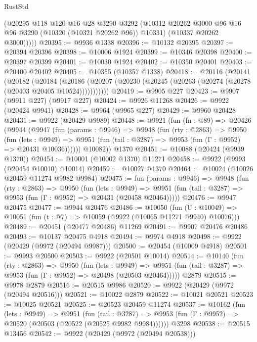 \begin{lexlean}{RustStd}
\begin{coremodule}
          (@20295
            @118
            @120
            @16
            @28
            @3290
            @3292
            (@10312 @20262 @3000 @96 @16 @96 @3290 (@10320 (@10321 @20262 @96)) @10331)
            (@10337 @20262 @3000)))))
@20395 := @9936 @1338
@20396 := @10132 @20395
@20397 := @20394 @20396
@20398 := @10006 @1924
@20399 := @10346 @20398
@20400 := @20397 @20399
@20401 := @10030 @1924
@20402 := @10350 @20401
@20403 := @20400 @20402
@20405 := @10355 (@10357 @1338)
@20418 := @20116
    (@20141
      (@20182
        (@20184
          (@20186 (@20207 (@20230 (@20245 (@20263 (@20274 (@20278 (@20403 @20405 @10524)))))))))))
@20419 := @9905 @227
@20423 := @9907 (@9911 @227) (@9917 @227)
@20424 := @9926 @11268
@20426 := @9922 (@20424 @9941)
@20428 := @9964 (@9965 @227)
@20429 := @9960 @20428
@20431 := @9922 (@20429 @9989)
@20448 := @9921
    (fun (fn : @89) =>
    @20426
      (@9944
        (@9947
          (fun (params : @9946) =>
          @9948
            (fun (rty : @2863) =>
            @9950
              (fun (lets : @9949) =>
              @9951 (fun (tail : @3287) => @9953 (fun (Γ : @9952) => @20431 @10036))))))
        @10082))
    @1370
@20451 := @10088 (@20424 (@9939 @1370))
@20454 := @10001 (@10002 @1370) @11271
@20458 := @9922 (@9993 (@20454 @10010) @10014)
@20459 := @10027 @1370
@20464 := @10024 (@10026 @20459 @11274 @9982 @9984)
@20475 := fun (params : @9946) =>
  @9948
    (fun (rty : @2863) =>
    @9950
      (fun (lets : @9949) =>
      @9951 (fun (tail : @3287) => @9953 (fun (Γ : @9952) => @20431 (@20458 @20464)))))
@20476 := @9947 @20475
@20477 := @9944 @20476
@20486 := @10050
    (fun (U : @10049) => @10051 (fun (t : @7) => @10059 (@9922 (@10065 @11271 @9940) @10076)))
@20489 := @20451 (@20477 @20486) @11269
@20491 := @9907 @20476 @20486
@20493 := @10137 @20475 @4918
@20494 := @9974 @4918
@20498 := @9922 (@20429 (@9972 (@20494 @9987)))
@20500 := @20454 (@10009 @4918)
@20501 := @9993 @20500
@20503 := @9922 (@20501 @10014)
@20514 := @10140
    (fun (rty : @2863) =>
    @9950
      (fun (lets : @9949) =>
      @9951 (fun (tail : @3287) => @9953 (fun (Γ : @9952) => @20498 (@20503 @20464)))))
    @2879
@20515 := @9978 @2879
@20516 := @20515 @9986
@20520 := @9922 (@20429 (@9972 (@20494 @20516)))
@20521 := @10022 @2879
@20522 := @10021 @20521
@20523 := @10025 @20521
@20525 := @20523 @20459 @11274
@20537 := @10162
    (fun (lets : @9949) =>
    @9951
      (fun (tail : @3287) =>
      @9953 (fun (Γ : @9952) => @20520 (@20503 (@20522 (@20525 @9982 @9984))))))
    @3298
@20538 := @20515 @13456
@20542 := @9922 (@20429 (@9972 (@20494 @20538)))

\end{coremodule}
\end{lexlean}
